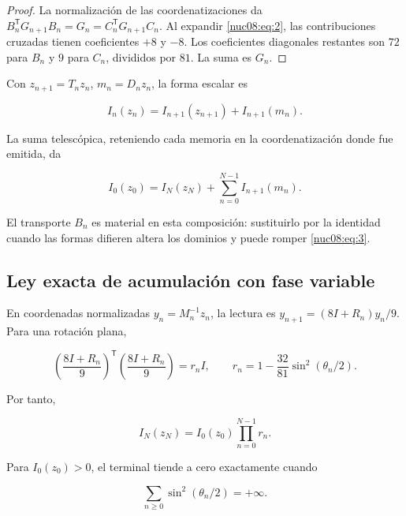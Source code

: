 \begin{proof}
La normalización de las coordenatizaciones da
\(B_n^\mathsf TG_{n+1}B_n=G_n=C_n^\mathsf TG_{n+1}C_n\).
Al expandir \eqref{nuc08:eq:2}, las contribuciones cruzadas tienen coeficientes \(+8\) y \(-8\). Los coeficientes diagonales restantes son \(72\) para \(B_n\) y \(9\) para \(C_n\), divididos por \(81\). La suma es \(G_n\).
\end{proof}

Con \(z_{n+1}=T_nz_n\), \(m_n=D_nz_n\), la forma escalar es

\begin{equation}
\boxed{I_n(z_n)=I_{n+1}(z_{n+1})+I_{n+1}(m_n).}
\label{nuc08:eq:4}
\end{equation}

La suma telescópica, reteniendo cada memoria en la coordenatización donde fue emitida, da

\begin{equation}
I_0(z_0)=I_N(z_N)+\sum_{n=0}^{N-1}I_{n+1}(m_n).
\label{nuc08:eq:5}
\end{equation}

El transporte \(B_n\) es material en esta composición: sustituirlo por la identidad cuando las formas difieren altera los dominios y puede romper \eqref{nuc08:eq:3}.

\subsection{Ley exacta de acumulación con fase variable}

En coordenadas normalizadas \(y_n=M_n^{-1}z_n\), la lectura es
\(y_{n+1}=(8I+R_n)y_n/9\). Para una rotación plana,

\begin{equation}
\left(\frac{8I+R_n}{9}\right)^\mathsf T
\left(\frac{8I+R_n}{9}\right)=r_n I,\qquad
r_n=1-\frac{32}{81}\sin^2(\theta_n/2).
\label{nuc08:eq:6}
\end{equation}

Por tanto,

\begin{equation}
I_N(z_N)=I_0(z_0)\prod_{n=0}^{N-1}r_n.
\label{nuc08:eq:7}
\end{equation}

\begin{theorem}
Para \(I_0(z_0)>0\), el terminal tiende a cero exactamente cuando

\begin{equation}
\sum_{n\ge0}\sin^2(\theta_n/2)=+\infty.
\label{nuc08:eq:8}
\end{equation}
\end{theorem}

